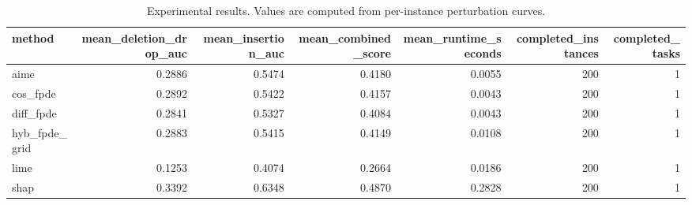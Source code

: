 \begin{table}[t]
\caption{Experimental results. Values are computed from per-instance perturbation curves.}
\label{tab:main_results_computed}
\centering
\begin{tabular}{lrrrrrr}
\toprule
method & mean\_deletion\_drop\_auc & mean\_insertion\_auc & mean\_combined\_score & mean\_runtime\_seconds & completed\_instances & completed\_tasks \\
\midrule
aime & 0.2886 & 0.5474 & 0.4180 & 0.0055 & 200 & 1 \\
cos\_fpde & 0.2892 & 0.5422 & 0.4157 & 0.0043 & 200 & 1 \\
diff\_fpde & 0.2841 & 0.5327 & 0.4084 & 0.0043 & 200 & 1 \\
hyb\_fpde\_grid & 0.2883 & 0.5415 & 0.4149 & 0.0108 & 200 & 1 \\
lime & 0.1253 & 0.4074 & 0.2664 & 0.0186 & 200 & 1 \\
shap & 0.3392 & 0.6348 & 0.4870 & 0.2828 & 200 & 1 \\
\bottomrule
\end{tabular}

\end{table}
